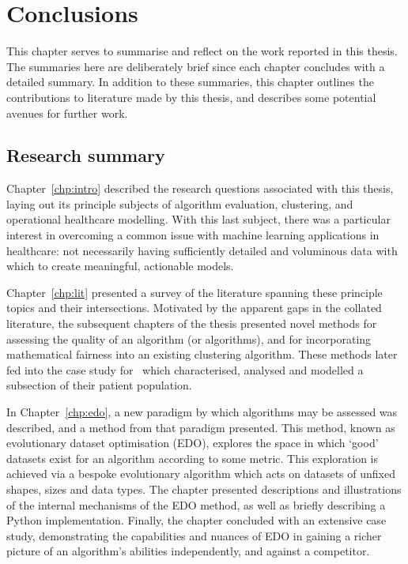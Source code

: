 \chapter{Conclusions}\label{chp:conc}

This chapter serves to summarise and reflect on the work reported in this
thesis. The summaries here are deliberately brief since each chapter concludes
with a detailed summary. In addition to these summaries, this chapter outlines
the contributions to literature made by this thesis, and describes some
potential avenues for further work.

\section{Research summary}\label{sec:research}

Chapter~\ref{chp:intro} described the research questions associated with this
thesis, laying out its principle subjects of algorithm evaluation, clustering,
and operational healthcare modelling. With this last subject, there was a
particular interest in overcoming a common issue with machine learning
applications in healthcare: not necessarily having sufficiently detailed and
voluminous data with which to create meaningful, actionable models.

Chapter~\ref{chp:lit} presented a survey of the literature spanning these
principle topics and their intersections. Motivated by the apparent gaps in the
collated literature, the subsequent chapters of the thesis presented novel
methods for assessing the quality of an algorithm (or algorithms), and for
incorporating mathematical fairness into an existing clustering algorithm. These
methods later fed into the case study for \ctmuhb\ which characterised, analysed
and modelled a subsection of their patient population.

In Chapter~\ref{chp:edo}, a new paradigm by which algorithms may be assessed was
described, and a method from that paradigm presented. This method, known as
evolutionary dataset optimisation (EDO), explores the space in which `good'
datasets exist for an algorithm according to some metric. This exploration is
achieved via a bespoke evolutionary algorithm which acts on datasets of unfixed
shapes, sizes and data types. The chapter presented descriptions and
illustrations of the internal mechanisms of the EDO method, as well as briefly
describing a Python implementation. Finally, the chapter concluded with an
extensive case study, demonstrating the capabilities and nuances of EDO in
gaining a richer picture of an algorithm's abilities independently, and against
a competitor.

